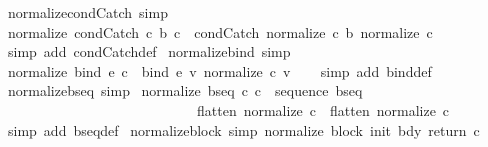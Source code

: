 \begin{isabellebody}
\isamarkupfalse%
\ normalize{\isacharunderscore}condCatch\ {\isacharbrackleft}simp{\isacharbrackright}{\isacharcolon}\isanewline
\ {\isachardoublequoteopen}normalize\ {\isacharparenleft}condCatch\ c{}\ b\ c{}{\isacharparenright}\ {\isacharequal}\ condCatch\ {\isacharparenleft}normalize\ c{}{\isacharparenright}\ b\ {\isacharparenleft}normalize\ c{}{\isacharparenright}{\isachardoublequoteclose}\isanewline
%
\isadelimproof
\ \ %
\endisadelimproof
%
\isatagproof
{}\isamarkupfalse%
\ {\isacharparenleft}simp\ add{\isacharcolon}\ condCatch{\isacharunderscore}def{\isacharparenright}%
\endisatagproof
{\isafoldproof}%
%
\isadelimproof
\isanewline
%
\endisadelimproof
\isanewline
{}\isamarkupfalse%
\ normalize{\isacharunderscore}bind\ {\isacharbrackleft}simp{\isacharbrackright}{\isacharcolon}\isanewline
\ {\isachardoublequoteopen}normalize\ {\isacharparenleft}bind\ e\ c{\isacharparenright}\ {\isacharequal}\ bind\ e\ {\isacharparenleft}{\isasymlambda}v{\isachardot}\ normalize\ {\isacharparenleft}c\ v{\isacharparenright}{\isacharparenright}{\isachardoublequoteclose}\isanewline
%
\isadelimproof
\ \ %
\endisadelimproof
%
\isatagproof
{}\isamarkupfalse%
\ {\isacharparenleft}simp\ add{\isacharcolon}\ bind{\isacharunderscore}def{\isacharparenright}%
\endisatagproof
{\isafoldproof}%
%
\isadelimproof
\isanewline
%
\endisadelimproof
\isanewline
{}\isamarkupfalse%
\ normalize{\isacharunderscore}bseq\ {\isacharbrackleft}simp{\isacharbrackright}{\isacharcolon}\isanewline
\ {\isachardoublequoteopen}normalize\ {\isacharparenleft}bseq\ c{}\ c{}{\isacharparenright}\ {\isacharequal}\ sequence\ bseq\isanewline
\ \ \ \ \ \ \ \ \ \ \ \ \ \ \ \ \ \ \ \ \ \ \ \ \ \ \ \ {\isacharparenleft}{\isacharparenleft}flatten\ {\isacharparenleft}normalize\ c{}{\isacharparenright}{\isacharparenright}\ {\isacharat}\ {\isacharparenleft}flatten\ {\isacharparenleft}normalize\ c{}{\isacharparenright}{\isacharparenright}{\isacharparenright}{\isachardoublequoteclose}\isanewline
%
\isadelimproof
\ \ %
\endisadelimproof
%
\isatagproof
{}\isamarkupfalse%
\ {\isacharparenleft}simp\ add{\isacharcolon}\ bseq{\isacharunderscore}def{\isacharparenright}%
\endisatagproof
{\isafoldproof}%
%
\isadelimproof
\isanewline
%
\endisadelimproof
\isanewline
{}\isamarkupfalse%
\ normalize{\isacharunderscore}block\ {\isacharbrackleft}simp{\isacharbrackright}{\isacharcolon}\ {\isachardoublequoteopen}normalize\ {\isacharparenleft}block\ init\ bdy\ return\ c{\isacharparenright}\ {\isacharequal}\ \isanewline

\end{isabellebody}
